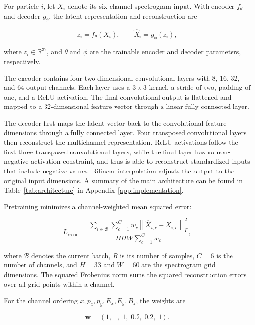 For particle \(i\), let \(X_i\) denote its six-channel spectrogram input. With encoder \(f_\theta\) and decoder \(g_\phi\), the latent representation and reconstruction are

\begin{equation} z_i=f_\theta(X_i), \qquad \widehat{X}_i=g_\phi(z_i), \end{equation}

where \(z_i\in\mathbb{R}^{32}\), and \(\theta\) and \(\phi\) are the trainable encoder and decoder parameters, respectively.

The encoder contains four two-dimensional convolutional layers with 8, 16, 32, and 64 output channels. Each layer uses a \(3\times3\) kernel, a stride of two, padding of one, and a ReLU activation. The final convolutional output is flattened and mapped to a 32-dimensional feature vector through a linear fully connected layer.

The decoder first maps the latent vector back to the convolutional feature dimensions through a fully connected layer. Four transposed convolutional layers then reconstruct the multichannel representation. ReLU activations follow the first three transposed convolutional layers, while the final layer has no non-negative activation constraint, and thus is able to reconstruct standardized inputs that include negative values. Bilinear interpolation adjusts the output to the original input dimensions. A summary of the main architecture can be found in Table~\ref{tab:architecture} in Appendix~\ref{app:implementation}.

Pretraining minimizes a channel-weighted mean squared error:

\begin{equation} L_{\mathrm{recon}} = \frac{ \displaystyle \sum_{i\in\mathcal{B}} \sum_{c=1}^{C} w_c \left\|\widehat{X}_{i,c}-X_{i,c}\right\|_F^2 }{ BHW\displaystyle\sum_{c=1}^{C}w_c }, \end{equation}

where \(\mathcal{B}\) denotes the current batch, \(B\) is its number of samples, \(C=6\) is the number of channels, and \(H=33\) and \(W=60\) are the spectrogram grid dimensions. The squared Frobenius norm sums the squared reconstruction errors over all grid points within a channel.

For the channel ordering \(x,p_x,p_y,E_x,E_y,B_z\), the weights are

\begin{equation} \boldsymbol{w}=(1,\;1,\;1,\;0.2,\;0.2,\;1). \end{equation}

